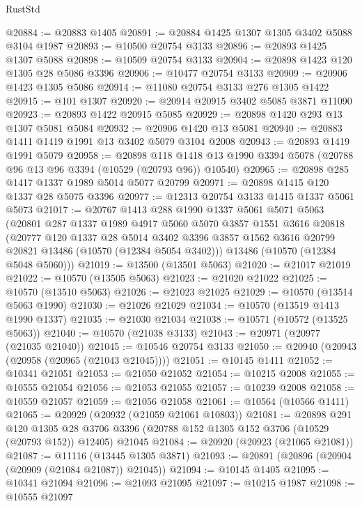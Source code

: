 \begin{lexlean}{RustStd}
\begin{coremodule}
@20884 := @20883 @1405
@20891 := @20884 @1425 @1307 @1305 @3402 @5088 @3104 @1987
@20893 := @10500 @20754 @3133
@20896 := @20893 @1425 @1307 @5088
@20898 := @10509 @20754 @3133
@20904 := @20898 @1423 @120 @1305 @28 @5086 @3396
@20906 := @10477 @20754 @3133
@20909 := @20906 @1423 @1305 @5086
@20914 := @11080 @20754 @3133 @276 @1305 @1422
@20915 := @101 @1307
@20920 := @20914 @20915 @3402 @5085 @3871 @11090
@20923 := @20893 @1422 @20915 @5085
@20929 := @20898 @1420 @293 @13 @1307 @5081 @5084
@20932 := @20906 @1420 @13 @5081
@20940 := @20883 @1411 @1419 @1991 @13 @3402 @5079 @3104 @2008
@20943 := @20893 @1419 @1991 @5079
@20958 := @20898
    @118
    @1418
    @13
    @1990
    @3394
    @5078
    (@20788 @96 @13 @96 @3394 (@10529 (@20793 @96)) @10540)
@20965 := @20898 @285 @1417 @1337 @1989 @5014 @5077 @20799
@20971 := @20898 @1415 @120 @1337 @28 @5075 @3396
@20977 := @12313 @20754 @3133 @1415 @1337 @5061 @5073
@21017 := @20767
    @1413
    @288
    @1990
    @1337
    @5061
    @5071
    @5063
    (@20801
      @287
      @1337
      @1989
      @4917
      @5060
      @5070
      @3857
      @1551
      @3616
      @20818
      (@20777
        @120
        @1337
        @28
        @5014
        @3402
        @3396
        @3857
        @1562
        @3616
        @20799
        @20821
        @13486
        (@10570 (@12384 @5054 @3402)))
      @13486
      (@10570 (@12384 @5048 @5060)))
@21019 := @13500 (@13501 @5063)
@21020 := @21017 @21019
@21022 := @10570 (@13505 @5063)
@21023 := @21020 @21022
@21025 := @10570 (@13510 @5063)
@21026 := @21023 @21025
@21029 := @10570 (@13514 @5063 @1990)
@21030 := @21026 @21029
@21034 := @10570 (@13519 @1413 @1990 @1337)
@21035 := @21030 @21034
@21038 := @10571 (@10572 (@13525 @5063))
@21040 := @10570 (@21038 @3133)
@21043 := @20971 (@20977 (@21035 @21040))
@21045 := @10546 @20754 @3133
@21050 := @20940 (@20943 (@20958 (@20965 (@21043 @21045))))
@21051 := @10145 @1411
@21052 := @10341 @21051
@21053 := @21050 @21052
@21054 := @10215 @2008
@21055 := @10555 @21054
@21056 := @21053 @21055
@21057 := @10239 @2008
@21058 := @10559 @21057
@21059 := @21056 @21058
@21061 := @10564 (@10566 @1411)
@21065 := @20929 (@20932 (@21059 @21061 @10803))
@21081 := @20898
    @291
    @120
    @1305
    @28
    @3706
    @3396
    (@20788 @152 @1305 @152 @3706 (@10529 (@20793 @152)) @12405)
    @21045
@21084 := @20920 (@20923 (@21065 @21081))
@21087 := @11116 (@13445 @1305 @3871)
@21093 := @20891 (@20896 (@20904 (@20909 (@21084 @21087)) @21045))
@21094 := @10145 @1405
@21095 := @10341 @21094
@21096 := @21093 @21095
@21097 := @10215 @1987
@21098 := @10555 @21097

\end{coremodule}
\end{lexlean}
